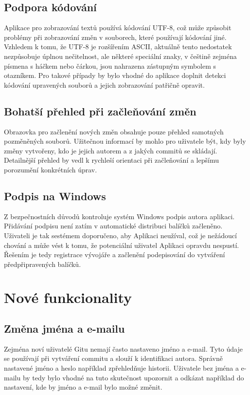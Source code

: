 \subsection{Podpora kódování}

Aplikace pro zobrazování textů používá kódování UTF-8, což může způsobit problémy při zobrazování změn v souborech, které používají kódování jiné. Vzhledem k tomu, že UTF-8 je rozšířením ASCII, aktuálně tento nedostatek nezpůsobuje úplnou nečitelnost, ale některé speciální znaky, v češtině zejména písmena s háčkem nebo čárkou, jsou nahrazena zástupným symbolem s otazníkem. Pro takové případy by bylo vhodné do aplikace doplnit detekci kódování upravených souborů a jejich zobrazování patřičně opravit.

\subsection{Bohatší přehled při začleňování změn}

Obrazovka pro začlenění nových změn obsahuje pouze přehled samotných pozměněných souborů. Užitečnou informací by mohlo pro uživatele být, kdy byly změny vytvořeny, kdo je jejich autorem a z jakých commitů se skládají. Detailnější přehled by vedl k rychleší orientaci při začleňování a lepšímu porozumění konkrétních úprav.

\subsection{Podpis na Windows}

Z bezpečnostních důvodů kontroluje systém Windows podpis autora aplikaci. Přidávání podpisu není zatím v automatické distribuci balíčků začleněno. Uživateli je tak sestémem doporučeno, aby Aplikaci neužíval, což je nežádoucí chování a může vést k tomu, že potenciální uživatel Aplikaci opravdu nespustí. Řešením je tedy registrace vývojáře a začlenění podepisování do vytváření předpřipravených balíčků.


\section{Nové funkcionality}

\subsection{Změna jména a e-mailu}

Zejména noví uživatelé Gitu nemají často nastaveno jméno a e-mail. Tyto údaje se používají při vytváření commitu a slouží k identifikaci autora. Správně nastavené jméno a heslo například zpřehledňuje historii. Uživatele bez jména a e-mailu by tedy bylo vhodné na tuto skutečnost upozornit a odkázat například do nastavení, kde by jméno a e-mail bylo možné změnit.

